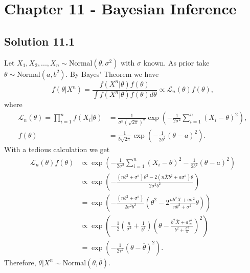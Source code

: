 \section*{Chapter 11 - Bayesian Inference}

\subsection*{Solution 11.1}

Let $X_1, X_2, ..., X_n \sim \mathrm{Normal}(\theta, \sigma^2)$ with $\sigma$ known.
As prior take $\theta \sim \mathrm{Normal}(a, b^2)$.
By Bayes' Theorem we have
\begin{equation*}
    f(\theta|X^n) = \frac{f(X^n|\theta) f(\theta)}{\int f(X^n|\theta)f(\theta) d\theta}
        \propto \mathcal{L}_n(\theta) f(\theta),
\end{equation*}
where
\begin{equation*}
    \begin{split}
        \mathcal{L}_n(\theta)
            = \prod_{i = 1}^n f(X_i|\theta)
            &= \frac{1}{\sigma^n (\sqrt{2\pi})^n} \exp\left(-\frac{1}{2\sigma^2} \sum_{i = 1}^n (X_i - \theta)^2\right), \\
        f(\theta) &= \frac{1}{b\sqrt{2\pi}} \exp\left(-\frac{1}{2b^2} (\theta - a)^2\right).
    \end{split}
\end{equation*}
With a tedious calculation we get
\begin{equation*}
    \begin{split}
        \mathcal{L}_n(\theta)f(\theta)
            &\propto \exp\left(-\frac{1}{2\sigma^2} \sum_{i = 1}^n (X_i - \theta)^2 - \frac{1}{2b^2} (\theta - a)^2\right) \\
            &\propto \exp\left(-\frac{(nb^2 + \sigma^2)\theta^2 - 2(n\overline{X}b^2 + a\sigma^2)\theta}{2\sigma^2b^2}\right) \\
            &= \exp\left(-\frac{(nb^2 + \sigma^2)}{2\sigma^2b^2}\left(\theta^2 - 2\frac{nb^2\overline{X} + a\sigma^2}{nb^2 + \sigma^2}\theta\right)\right) \\
            &\propto \exp\left(-\frac{1}{2}\left(\frac{n}{\sigma^2} + \frac{1}{b^2}\right)\left(\theta - \frac{b^2\overline{X} + a\frac{\sigma^2}{n}}{b^2 + \frac{\sigma^2}{n}}\right)^2\right) \\
            &=\exp\left(-\frac{1}{2\tau^2}(\theta - \overline{\theta})^2\right).
    \end{split}
\end{equation*}
Therefore, $\theta|X^n \sim \mathrm{Normal}(\theta, \overline{\theta})$.


